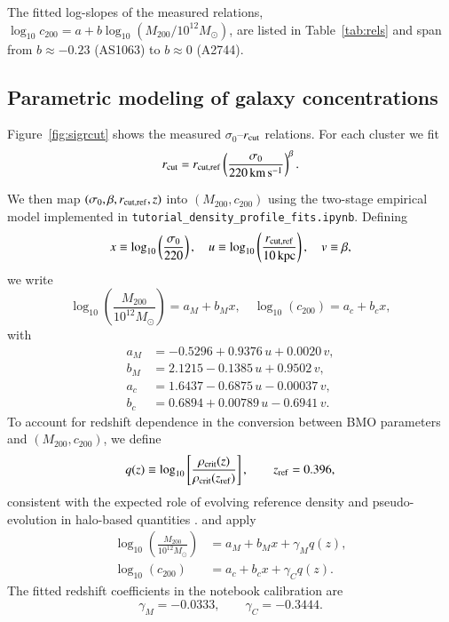 \documentclass{aa}
\begin{document}
The fitted log-slopes of the measured relations, $\log_{10}c_{200}=a+b\log_{10}(M_{200}/10^{12}M_\odot)$, are listed in Table~\ref{tab:rels} and span from $b\approx-0.23$ (AS1063) to $b\approx0$ (A2744).

\subsection{Parametric modeling of galaxy concentrations}
Figure~\ref{fig:sigrcut} shows the measured $\sigma_0$--$r_{\rm cut}$ relations. For each cluster we fit
\begin{equation}
r_{\rm cut}=r_{{\rm cut},\mathrm{ref}}\left(\frac{\sigma_0}{220\,\mathrm{km\,s^{-1}}}\right)^\beta.
\label{eq:sigrcut_fit}
\end{equation}

We then map $(\sigma_0,\beta,r_{{\rm cut},\mathrm{ref}},z)$ into $(M_{200},c_{200})$ using the two-stage empirical model implemented in \texttt{tutorial\_density\_profile\_fits.ipynb}. Defining
\begin{equation}
x\equiv\log_{10}\left(\frac{\sigma_0}{220}\right),\quad
u\equiv\log_{10}\left(\frac{r_{{\rm cut},\mathrm{ref}}}{10\,\mathrm{kpc}}\right),\quad
v\equiv\beta,
\end{equation}
we write
\begin{equation}
\log_{10}\left(\frac{M_{200}}{10^{12}M_\odot}\right)=a_M+b_Mx,
\quad
\log_{10}(c_{200})=a_c+b_cx,
\end{equation}
with
\begin{align}
a_M &= -0.5296 + 0.9376\,u + 0.0020\,v,\\
b_M &=  2.1215 - 0.1385\,u + 0.9502\,v,\\
a_c &=  1.6437 - 0.6875\,u - 0.00037\,v,\\
b_c &=  0.6894 + 0.00789\,u - 0.6941\,v.
\end{align}
To account for redshift dependence in the conversion between BMO parameters and $(M_{200},c_{200})$, we define
\begin{equation}
q(z)\equiv \log_{10}\left[\frac{\rho_{\rm crit}(z)}{\rho_{\rm crit}(z_{\rm ref})}\right],\qquad z_{\rm ref}=0.396,
\end{equation}
consistent with the expected role of evolving reference density and pseudo-evolution in halo-based quantities \citep{Diemer2013,DiemerKravtsov2015}.
and apply
\begin{align}
\log_{10}\left(\frac{M_{200}}{10^{12}M_\odot}\right) &= a_M+b_Mx+\gamma_M q(z),\\
\log_{10}(c_{200}) &= a_c+b_cx+\gamma_C q(z).
\end{align}
The fitted redshift coefficients in the notebook calibration are
\begin{equation}
\gamma_M=-0.0333,\qquad \gamma_C=-0.3444.
\end{equation}
\end{document}
